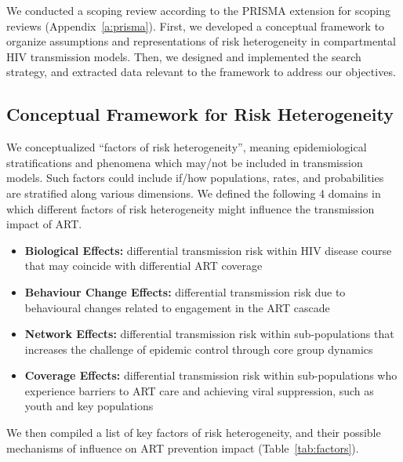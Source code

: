 We conducted a scoping review according to the PRISMA extension for scoping reviews
(Appendix~\ref{a:prisma}).
First, we developed a conceptual framework to organize
assumptions and representations of risk heterogeneity
in compartmental HIV transmission models.
Then, we designed and implemented the search strategy,
and extracted data relevant to the framework to address our objectives.
\subsection{Conceptual Framework for Risk Heterogeneity}
\label{ss:meth:framework}
We conceptualized ``factors of risk heterogeneity'', meaning
epidemiological stratifications and phenomena which may/not be included in transmission models.
Such factors could include if/how populations, rates, and probabilities
are stratified along various dimensions.
We defined the following 4 domains in which
different factors of risk heterogeneity might influence the transmission impact of ART.
\begin{itemize}
  \item \textbf{Biological Effects:}
  differential transmission risk within HIV disease course
  that may coincide with differential ART coverage
  \cite{Pilcher2004}
  \item \textbf{Behaviour Change Effects:}
  differential transmission risk due to
  behavioural changes related to engagement in the ART cascade
  \cite{Ramachandran2016,Tiwari2020}
  \item \textbf{Network Effects:}
  differential transmission risk within sub-populations
  that increases the challenge of epidemic control through core group dynamics
  \cite{Boily1997,Watts2010,Dodd2010}
  \item \textbf{Coverage Effects:}
  differential transmission risk within sub-populations
  who experience barriers to ART care and achieving viral suppression,
  such as youth and key populations
  \cite{Mountain2014,Lancaster2016,Hakim2018,Green2020}
\end{itemize}
We then compiled a list of key factors of risk heterogeneity,
and their possible mechanisms of influence on ART prevention impact (Table~\ref{tab:factors}).
\begin{sidewaystable}
  \caption{%
    Factors of heterogeneity in HIV transmission
    and their possible mechanisms of influence on the prevention impact of ART interventions}
  
  \label{tab:factors}
\end{sidewaystable}
